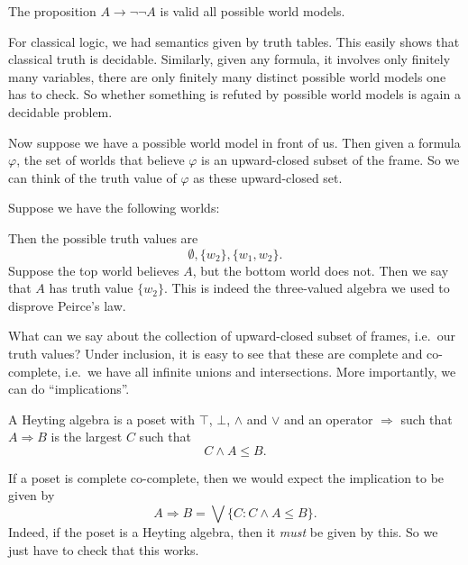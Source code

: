 \documentclass[a4paper]{article}
\begin{document}
\begin{eg}
  The proposition $A \to \neg \neg A$ is valid all possible world models.

\end{eg}

For classical logic, we had semantics given by truth tables. This easily shows that classical truth is decidable. Similarly, given any formula, it involves only finitely many variables, there are only finitely many distinct possible world models one has to check. So whether something is refuted by possible world models is again a decidable problem.

Now suppose we have a possible world model in front of us. Then given a formula $\varphi$, the set of worlds that believe $\varphi$ is an upward-closed subset of the frame. So we can think of the truth value of $\varphi$ as these upward-closed set.
\begin{eg}
  Suppose we have the following worlds:
  \begin{center}
  \end{center}
  Then the possible truth values are
  \[
    \emptyset, \{w_2\}, \{w_1, w_2\}.
  \]
  Suppose the top world believes $A$, but the bottom world does not. Then we say that $A$ has truth value $\{w_2\}$. This is indeed the three-valued algebra we used to disprove Peirce's law.
\end{eg}
What can we say about the collection of upward-closed subset of frames, i.e.\ our truth values? Under inclusion, it is easy to see that these are complete and co-complete, i.e.\ we have all infinite unions and intersections. More importantly, we can do ``implications''.
\begin{defi}
  A Heyting algebra is a poset with $\top$, $\bot$, $\wedge$ and $\vee$ and an operator $\Rightarrow$ such that $A \Rightarrow B$ is the largest $C$ such that
  \[
    C \wedge A \leq B.
  \]
\end{defi}
If a poset is complete co-complete, then we would expect the implication to be given by
\[
  A \Rightarrow B = \bigvee \{C : C \wedge A \leq B\}.
\]
Indeed, if the poset is a Heyting algebra, then it \emph{must} be given by this. So we just have to check that this works.
\end{document}
